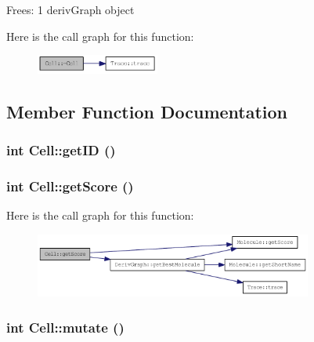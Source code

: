 Frees: 1 derivGraph object 

Here is the call graph for this function:\nopagebreak
\begin{figure}[H]
\begin{center}
\leavevmode
\includegraphics[width=115pt]{classCell_a9fa559f7a28e2b4336c6879ca09304d8_cgraph}
\end{center}
\end{figure}


\subsection{Member Function Documentation}
\hypertarget{classCell_a6fb5e28360b3a6e53400af8b950f6203}{
\subsubsection[{getID}]{\setlength{\rightskip}{0pt plus 5cm}int Cell::getID ()}}
\label{classCell_a6fb5e28360b3a6e53400af8b950f6203}
\hypertarget{classCell_a3fbb8b244cc5c516d0728a987d07bf0f}{
\subsubsection[{getScore}]{\setlength{\rightskip}{0pt plus 5cm}int Cell::getScore ()}}
\label{classCell_a3fbb8b244cc5c516d0728a987d07bf0f}


Here is the call graph for this function:\nopagebreak
\begin{figure}[H]
\begin{center}
\leavevmode
\includegraphics[width=259pt]{classCell_a3fbb8b244cc5c516d0728a987d07bf0f_cgraph}
\end{center}
\end{figure}
\hypertarget{classCell_a555fa98c5f1dc8d7c88c7a24f69994ff}{
\subsubsection[{mutate}]{\setlength{\rightskip}{0pt plus 5cm}int Cell::mutate ()}}
\label{classCell_a555fa98c5f1dc8d7c88c7a24f69994ff}


